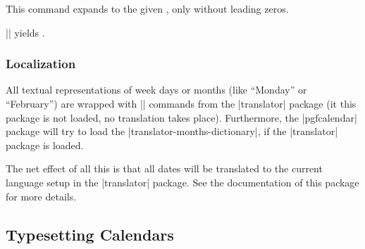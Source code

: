 \begin{command}{\pgfcalendarnoleadingzero{}}
  This command expands to the given , only without
  leading zeros. 

  \example || yields
  \texttt{}.   
\end{command}


\subsubsection{Localization}

\label{section-calendar-locale}
All textual representations of week days or months (like ``Monday'' or
``February'') are wrapped with |\translate| commands from the
|translator| package (it this package is not loaded, no translation
takes place). Furthermore, the |pgfcalendar| package will try to load
the |translator-months-dictionary|, if the |translator| package is
loaded.

The net effect of all this is that all dates will be translated to the
current language setup in the |translator| package. See the
documentation of this package for more details.



\subsection{Typesetting Calendars}

